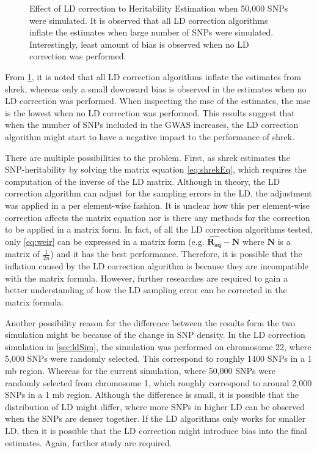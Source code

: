 \documentclass[12pt]{scrbook}
\begin{document}
\begin{figure}[t]
{		\label{fig:bigvarLDCor}
	}
	\caption[Effect of LD correction to Heritability Estimation with 50,000 SNPs]
	{Effect of LD correction to Heritability Estimation when 50,000 \glspl{SNP} were simulated.
		It is observed that all \gls{LD} correction algorithms inflate the estimates when large number of \glspl{SNP} were simulated.
		Interestingly, least amount of bias is observed when no \gls{LD} correction was performed.
	} 
	\label{fig:ldCorBigCom}
\end{figure}

From \cref{fig:ldCorBigCom}, it is noted that all \gls{LD} correction algorithms inflate the estimates from \gls{shrek}, whereas only a small downward bias is observed in the estimates when no \gls{LD} correction was performed. 
When inspecting the \gls{mse} of the estimates, the \gls{mse} is the lowest when no \gls{LD} correction was performed. 
This results suggest that when the number of \glspl{SNP} included in the \gls{GWAS} increases, the \gls{LD} correction algorithm might start to have a negative impact to the performance of \gls{shrek}.

There are multiple possibilities to the problem. 
First, as \gls{shrek} estimates the \gls{SNP}-heritability by solving the matrix equation \cref{eq:shrekEq}, which requires the computation of the inverse of the \gls{LD} matrix.
Although in theory, the \gls{LD} correction algorithm can adjust for the sampling errors in the \gls{LD}, the adjustment was applied in a per element-wise fashion. 
It is unclear how this per element-wise correction affects the matrix equation nor is there any methods for the correction to be applied in a matrix form. 
In fact, of all the \gls{LD} correction algorithms tested, only \cref{eq:weir} can be expressed in a matrix form (e.g. $\boldsymbol{\hat{R_{sq}}}-\boldsymbol{N}$ where $\boldsymbol{N}$ is a matrix of $\frac{1}{2n}$) and it has the best performance.
Therefore, it is possible that the inflation caused by the \gls{LD} correction algorithm is because they are incompatible with the matrix formula. 
However, further researches are required to gain a better understanding of how the \gls{LD} sampling error can be corrected in the matrix formula.

Another possibility reason for the difference between the results form the two simulation might be because of the change in \gls{SNP} density.
In the \gls{LD} correction simulation in \cref{sec:ldSim}, the simulation was performed on chromosome 22, where 5,000 \glspl{SNP} were randomly selected. 
This correspond to roughly 1400 \glspl{SNP} in a 1 \gls{mb} region.
Whereas for the current simulation, where 50,000 \glspl{SNP} were randomly selected from chromosome 1, which roughly correspond to around 2,000 \glspl{SNP} in a 1 \gls{mb} region.
Although the difference is small, it is possible that the distribution of \gls{LD} might differ, where more \glspl{SNP} in higher \gls{LD} can be observed when the \glspl{SNP} are denser together. 
If the \gls{LD} algorithms only works for smaller \gls{LD}, then it is possible that the \gls{LD} correction might introduce bias into the final estimates.
Again, further study are required. 
\end{document}

